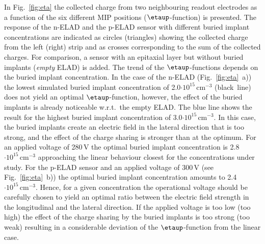 \documentclass[a4paper,11pt]{article}
\begin{document}
In Fig.~\ref{fig:eta} the collected charge from two neighbouring readout electrodes as a function of the six different MIP positions ($\etaup$-function) is presented.
The response of the n-ELAD and the p-ELAD sensor with different buried implant concentrations are indicated as
 circles (triangles) showing the collected charge from the left (right) strip
 and as crosses corresponding to the sum of the collected charges. 
For comparison, a sensor with an epitaxial layer but without buried implants (\textit{empty} ELAD) is added. 
The trend of the $\etaup$-functions depends on the buried implant concentration.
In the case of the n-ELAD (Fig.~\ref{fig:eta}~a)) the lowest simulated buried implant concentration of 2.0$\mathrm{\cdot10^{15}\,cm^{-3}}$ (black~line) does not yield an optimal $\etaup$-function,
 however, the effect of the buried implants is already noticeable w.r.t.\ the empty ELAD. 
The blue line shows the result for the highest buried implant concentration of 3.0$\mathrm{\cdot10^{15}\,cm^{-3}}$. 
In this case, the buried implants create an electric field in the lateral direction that is too strong, and the effect of the charge sharing is stronger than at the optimum.
For an applied voltage of 280\,V the optimal buried implant concentration is 2.8$\mathrm{\cdot10^{15}\,cm^{-3}}$ approaching the linear behaviour closest for the concentrations under study.
For the p-ELAD sensor and an applied voltage of 300\,V (see Fig.~\ref{fig:eta}~b)) the optimal buried implant concentration amounts to 2.4$\mathrm{\cdot10^{15}\,cm^{-3}}$.
Hence, for a given concentration the operational voltage should be carefully chosen to yield an optimal ratio between the electric field strength in the longitudinal and the lateral direction. 
If the applied voltage is too low (too high) the effect of the charge sharing by the buried implants is too strong (too weak) resulting in a considerable deviation of the $\etaup$-function from the linear case.
\end{document}
